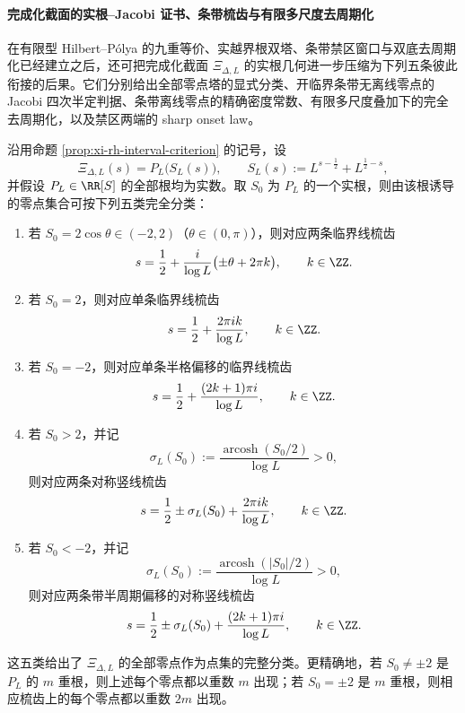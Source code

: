 \paragraph{完成化截面的实根--Jacobi 证书、条带梳齿与有限多尺度去周期化}
在有限型 Hilbert--P{\'o}lya 的九重等价、实越界根双塔、条带禁区窗口与双底去周期化已经建立之后，还可把完成化截面 \(\Xi_{\Delta,L}\) 的实根几何进一步压缩为下列五条彼此衔接的后果。它们分别给出全部零点塔的显式分类、开临界条带无离线零点的 Jacobi 四次半定判据、条带离线零点的精确密度常数、有限多尺度叠加下的完全去周期化，以及禁区两端的 sharp onset law。

\begin{theorem}[完成化实根诱导的零点塔完全分类]\label{thm:xi-time-part28b-completed-realroot-zero-tower-classification}
沿用命题 \ref{prop:xi-rh-interval-criterion} 的记号，设
\[
\Xi_{\Delta,L}(s)=P_L\!\bigl(S_L(s)\bigr),
\qquad
S_L(s):=L^{s-\frac12}+L^{\frac12-s},
\]
并假设 \(P_L\in\RR[S]\) 的全部根均为实数。取 \(S_0\) 为 \(P_L\) 的一个实根，则由该根诱导的零点集合可按下列五类完全分类：
\begin{enumerate}
  \item 若 \(S_0=2\cos\theta\in(-2,2)\)（\(\theta\in(0,\pi)\)），则对应两条临界线梳齿
  \[
  s=\frac12+\frac{i}{\log L}\bigl(\pm\theta+2\pi k\bigr),
  \qquad k\in\ZZ.
  \]
  \item 若 \(S_0=2\)，则对应单条临界线梳齿
  \[
  s=\frac12+\frac{2\pi i k}{\log L},
  \qquad k\in\ZZ.
  \]
  \item 若 \(S_0=-2\)，则对应单条半格偏移的临界线梳齿
  \[
  s=\frac12+\frac{(2k+1)\pi i}{\log L},
  \qquad k\in\ZZ.
  \]
  \item 若 \(S_0>2\)，并记
  \[
  \sigma_L(S_0):=\frac{\operatorname{arcosh}(S_0/2)}{\log L}>0,
  \]
  则对应两条对称竖线梳齿
  \[
  s=\frac12\pm \sigma_L(S_0)+\frac{2\pi i k}{\log L},
  \qquad k\in\ZZ.
  \]
  \item 若 \(S_0<-2\)，并记
  \[
  \sigma_L(S_0):=\frac{\operatorname{arcosh}(|S_0|/2)}{\log L}>0,
  \]
  则对应两条带半周期偏移的对称竖线梳齿
  \[
  s=\frac12\pm \sigma_L(S_0)+\frac{(2k+1)\pi i}{\log L},
  \qquad k\in\ZZ.
  \]
\end{enumerate}
这五类给出了 \(\Xi_{\Delta,L}\) 的全部零点作为点集的完整分类。更精确地，若 \(S_0\neq\pm2\) 是 \(P_L\) 的 \(m\) 重根，则上述每个零点都以重数 \(m\) 出现；若 \(S_0=\pm2\) 是 \(m\) 重根，则相应梳齿上的每个零点都以重数 \(2m\) 出现。
\end{theorem}
